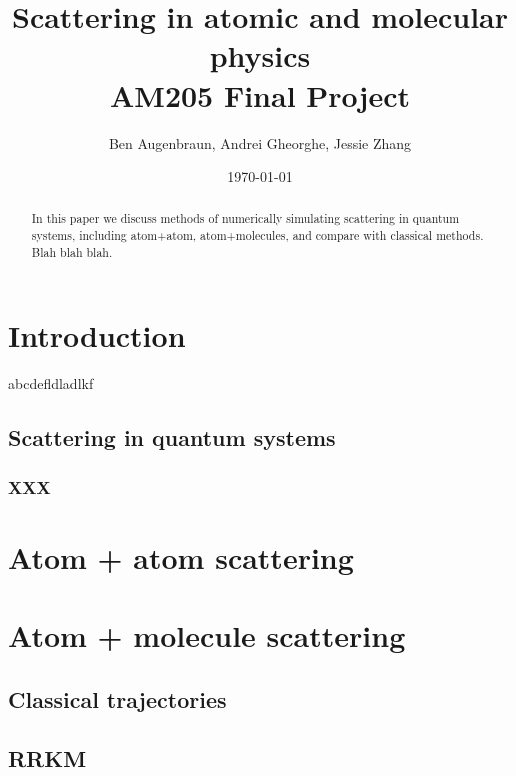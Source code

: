 \documentclass[%
 reprint,
 amsmath,amssymb,
 aps,
]{revtex4-1}
\begin{document}

\title{Scattering in atomic and molecular physics \\ AM205 Final Project}%

\author{Ben Augenbraun, Andrei Gheorghe, Jessie Zhang}

\date{\today}%

\begin{abstract}
In this paper we discuss methods of numerically simulating scattering in quantum systems, including atom+atom, atom+molecules, and compare with classical methods. Blah blah blah.

\end{abstract}

\maketitle

\section{\label{sec:level1}Introduction}


abcdefldladlkf

\subsection{\label{sec:level2}Scattering in quantum systems}


\subsubsection{XXX}

\section{\label{sec:level1}Atom + atom scattering}

\section{\label{sec:level1}Atom + molecule scattering}

\subsection{\label{sec:level1}Classical trajectories}

\subsection{\label{sec:level2}RRKM}

\section{}


\end{document}
